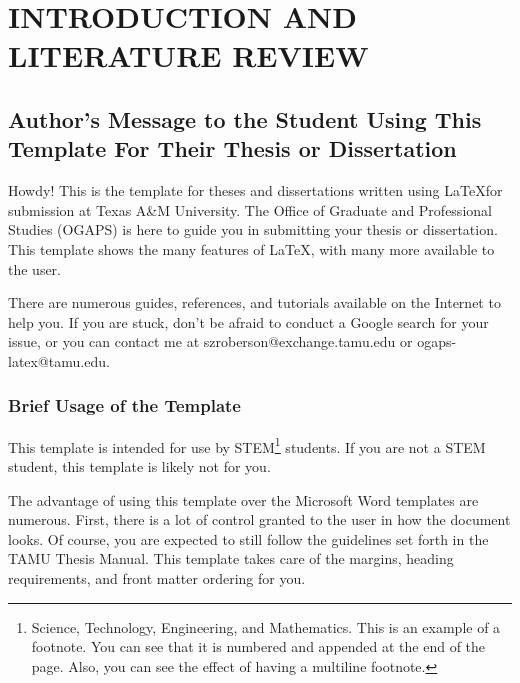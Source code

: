 %
%
%
%



\pagestyle{plain} %
\setcounter{page}{1}


\chapter{\uppercase {Introduction and Literature Review}}

\section{Author's Message to the Student Using This Template For Their Thesis or Dissertation}

Howdy! This is the template for theses and dissertations written using \LaTeX for submission at Texas A\&M University. The Office of Graduate and Professional Studies (OGAPS) is here to guide you in submitting your thesis or dissertation. This template shows the many features of \LaTeX, with many more available to the user.

There are numerous guides, references, and tutorials available on the Internet to help you. If you are stuck, don't be afraid to conduct a Google search for your issue, or you can contact me at szroberson@exchange.tamu.edu or ogaps-latex@tamu.edu.


\subsection{Brief Usage of the Template}

This template is intended for use by STEM\footnote{Science, Technology, Engineering, and Mathematics. This is an example of a footnote. You can see that it is numbered and appended at the end of the page. Also, you can see the effect of having a multiline footnote.} students. If you are not a STEM student, this template is likely not for you.

The advantage of using this template over the Microsoft Word templates are numerous. First, there is a lot of control granted to the user in how the document looks. Of course, you are expected to still follow the guidelines set forth in the TAMU Thesis Manual. This template takes care of the margins, heading requirements, and front matter ordering for you.


